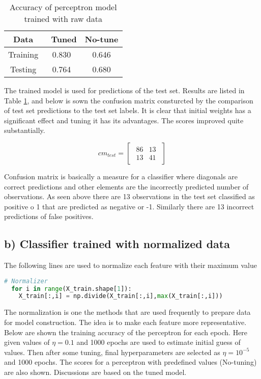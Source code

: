 \documentclass[11pt]{article}
\begin{document}
\bgroup
\def\arraystretch{1.5}%
\begin{table}[H]
\centering
\caption{Accuracy of perceptron model trained with raw data}
\begin{tabular}{|c|c|c|}
\hline
Data   & \ Tuned & No-tune\\ \hline
Training & 0.830 &  0.646 \\ \hline
Testing  & 0.764 &  0.680 \\ \hline
\end{tabular}
\label{table:q2a}
\end{table}
\egroup

The trained model is used for predictions of the test set. Results are listed in Table \ref{table:q2a}, and below is sown the confusion matrix consturcted by the comparison of test set predictions to the test set labels. It is clear that initial weights has a significant effect and tuning it has its advantages. The scores improved quite substantially.

$$
cm_{test}=
 \begin{bmatrix}
 \begin{array}{rr}
86 &  13  \\
13 &  41 
\end{array}   
\end{bmatrix}
$$

Confusion matrix is basically a measure for a classifier where diagonals are correct predictions and other elements are the incorrectly predicted number of observations. As seen above there are 13 observations in the test set classified as positive o 1 that are predicted as negative or -1. Similarly there are 13 incorrect predictions of false positives. \medskip

\subsection*{b) Classifier trained with normalized data}
The following lines are used to normalize each feature with their maximum value
\begin{lstlisting}[language=Python, caption=Feature Normalizer]
 # Normalizer
  for i in range(X_train.shape[1]):
    X_train[:,i] = np.divide(X_train[:,i],max(X_train[:,i]))
\end{lstlisting}

The normalization is one the methods that are used frequently to prepare data for model construction. The idea is to make each feature more representative. Below are shown the training accuracy of the perceptron for each epoch. Here given values of $\eta = 0.1$ and 1000 epochs are used to estimate initial guess of values. Then after some tuning, final hyperparameters are selected as $\eta = 10^{-5}$ and 1000 epochs. The scores for a perceptron with predefined values (No-tuning) are also shown. Discussions are based on the tuned model.
\end{document}
